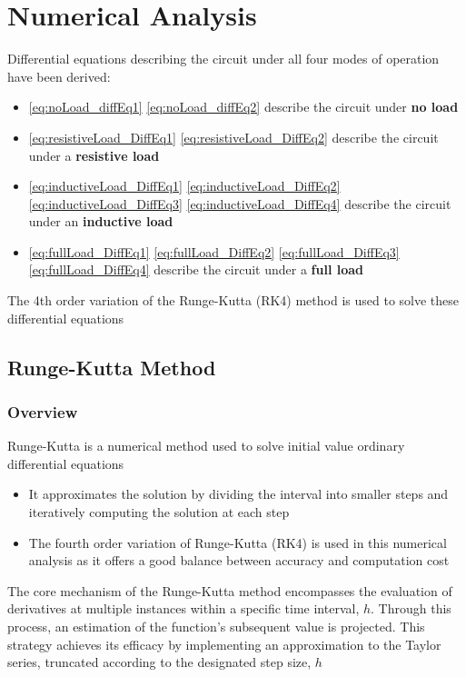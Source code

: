 \section{Numerical Analysis}
Differential equations describing the circuit under all four modes of operation have been derived:
\begin{itemize}
    \item \eqref{eq:noLoad_diffEq1} \eqref{eq:noLoad_diffEq2} describe the circuit under \textbf{no load}
    \item \eqref{eq:resistiveLoad_DiffEq1} \eqref{eq:resistiveLoad_DiffEq2}  describe the circuit under a \textbf{resistive load}
    \item \eqref{eq:inductiveLoad_DiffEq1} \eqref{eq:inductiveLoad_DiffEq2} \eqref{eq:inductiveLoad_DiffEq3} \eqref{eq:inductiveLoad_DiffEq4} describe the circuit under an \textbf{inductive load}
    \item \eqref{eq:fullLoad_DiffEq1} \eqref{eq:fullLoad_DiffEq2} \eqref{eq:fullLoad_DiffEq3} \eqref{eq:fullLoad_DiffEq4} describe the circuit under a \textbf{full load}
\end{itemize}

The 4th order variation of the Runge-Kutta (RK4) method is used to solve these differential equations

\subsection{Runge-Kutta Method}
\subsubsection{Overview}
Runge-Kutta is a numerical method used to solve initial value ordinary differential equations
\begin{itemize}
    \item It approximates the solution by dividing the interval into smaller steps and iteratively computing the solution at each step \citep{rungeKutta}
    \item The fourth order variation of Runge-Kutta (RK4) is used in this numerical analysis as it offers a good balance between accuracy and computation cost
\end{itemize}

The core mechanism of the Runge-Kutta method encompasses the evaluation of derivatives at multiple instances within a specific time interval, $h$. Through this process, an estimation of the function's subsequent value is projected. This strategy achieves its efficacy by implementing an approximation to the Taylor series, truncated according to the designated step size, $h$ \citep{rungeKutta}

